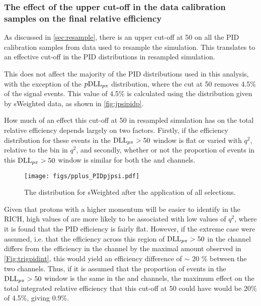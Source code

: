 
\subsubsection{The effect of the upper cut-off in the data calibration samples on the final relative efficiency}
\label{sec:cutpid}
As discussed in \autoref{sec:resample}, there is an upper cut-off at 50 on all the PID calibration samples from data used to resample the simulation. This translates to an effective cut-off in the PID distributions in resampled simulation.%

This does not affect the majority of the PID distributions used in this analysis, with the exception of the $p\mathrm{DLL}_{{p}{\pi}}$ distribution, where the cut at 50 removes 4.5\% of the \Lbpijpsi signal events. This value of 4.5\% is calculated using the \dllppi distribution given by sWeighted \Lbpijpsi data, as shown in \autoref{fig:jpsipidp}.

How much of an effect this cut-off at 50 in resampled simulation has on the total relative efficiency depends largely on two factors. Firstly, if the efficiency distribution for these events in the $\mathrm{DLL}_{{p}{\pi}}>50$ window is flat or varied with $q^{2}$, relative to the \jpsi bin in $q^{2}$, and secondly, whether or not the proportion of events in this $\mathrm{DLL}_{{p}{\pi}}>50$ window is similar for both the \Lbpi and \Lbpijpsi channels.

\begin{figure}[h!]
  \def\nh{0.7\textwidth}
  \centering
  \texttt{[image: figs/pplus\_PIDpjpsi.pdf]}
  \caption{The \dllppi distribution for sWeighted \Lbpijpsi after the application of all selections.}
  \label{fig:jpsipidp}
  \end{figure}

Given that protons with a higher momentum will be easier to identify in the RICH, high values of \dllppi are more likely to be associated with low values of $q^{2}$, where it is found that the PID efficiency is fairly flat. However, if the extreme case were assumed, i.e. that the efficiency across this region of $\mathrm{DLL}_{{p}{\pi}}>50$ in the \Lbpi channel differs from the efficiency in the \Lbpijpsi channel by the maximal amount observed in \autoref{Fig:trigpidint}, this would yield an efficiency difference of $\sim$ 20 \% between the two channels. Thus, if it is assumed that the proportion of events in the $\mathrm{DLL}_{{p}{\pi}}>50$ window is the same in the \Lbpi and \Lbpijpsi channels, the maximum effect on the total integrated relative efficiency that this cut-off at 50 could have would be 20\% of 4.5\%, giving 0.9\%.

